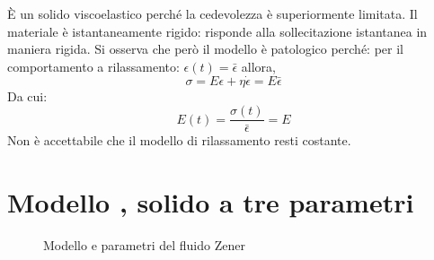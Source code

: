 È un solido viscoelastico perché la cedevolezza è superiormente limitata.
Il materiale è istantaneamente rigido: risponde alla sollecitazione istantanea in maniera rigida.
Si osserva che però il modello è patologico perché:
per il comportamento a rilassamento: $\epsilon(t) = \bar{\epsilon}$ allora,
\begin{equation}
\sigma = E\epsilon + \eta \dot{\epsilon} = E \bar{\epsilon}
\end{equation}
Da cui:
\begin{equation}
E(t) = \frac{\sigma(t)}{\bar{\epsilon}} = E
\end{equation}
Non è accettabile che il modello di rilassamento resti costante.

\section{Modello , solido a tre parametri}

\begin{figure}
\centering
{}\quad
{}
\caption{Modello e parametri del fluido Zener}
\label{def:Zener}		
\end{figure}

